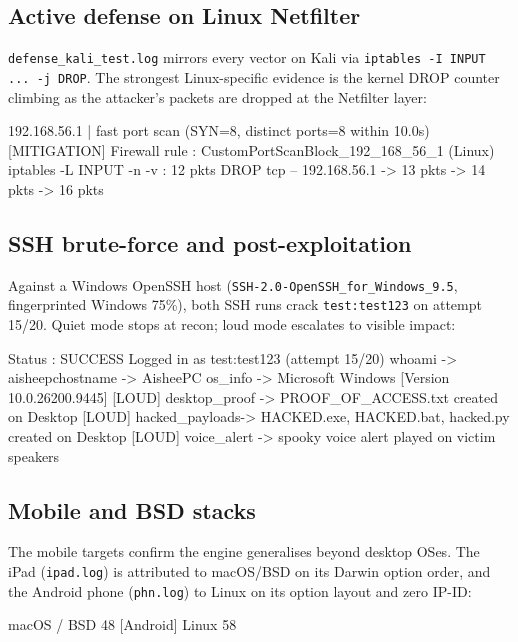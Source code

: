\subsection{Active defense on Linux Netfilter}\label{sub:defkali}
\texttt{defense\_kali\_test.log} mirrors every vector on Kali via
\texttt{iptables -I INPUT ... -j DROP}. The strongest Linux-specific evidence is the kernel
DROP counter climbing as the attacker's packets are dropped at the Netfilter layer:
\begin{logbox}
[ALERT] 192.168.56.1 | fast port scan (SYN=8, distinct ports=8 within 10.0s)
[MITIGATION] Firewall rule : CustomPortScanBlock_192_168_56_1 (Linux)
  iptables -L INPUT -n -v :
    12 pkts DROP tcp -- 192.168.56.1   ->   13 pkts   ->   14 pkts   ->   16 pkts
\end{logbox}

\subsection{SSH brute-force and post-exploitation}\label{sub:ssh}
Against a Windows OpenSSH host (\texttt{SSH-2.0-OpenSSH\_for\_Windows\_9.5}, fingerprinted
Windows 75\%), both SSH runs crack \texttt{test:test123} on attempt 15/20. Quiet mode stops
at recon; loud mode escalates to visible impact:
\begin{logbox}
  Status : SUCCESS   Logged in as test:test123 (attempt 15/20)
  whoami -> aisheepc\test   hostname -> AisheePC
  os_info -> Microsoft Windows [Version 10.0.26200.9445]
  [LOUD] desktop_proof  -> PROOF_OF_ACCESS.txt created on Desktop
  [LOUD] hacked_payloads-> HACKED.exe, HACKED.bat, hacked.py created on Desktop
  [LOUD] voice_alert    -> spooky voice alert played on victim speakers
\end{logbox}

\subsection{Mobile and BSD stacks}\label{sub:mobile}
The mobile targets confirm the engine generalises beyond desktop OSes. The iPad
(\texttt{ipad.log}) is attributed to macOS/BSD on its Darwin option order, and the Android
phone (\texttt{phn.log}) to Linux on its option layout and zero IP-ID:
\begin{logbox}
[iPad]    macOS / BSD 48%
[Android] Linux 58%
\end{logbox}

